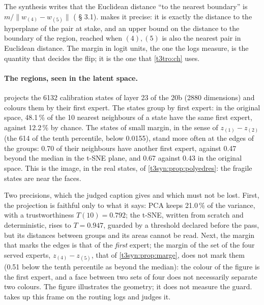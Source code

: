 \begin{remarque}
The synthesis writes that the Euclidean distance ``to the nearest boundary'' is $m/\|w_{(4)} - w_{(5)}\|$ ( § 3.1).  makes it precise: it is exactly the distance to the hyperplane of the pair at stake, and an upper bound on the distance to the boundary of the region, reached when $(4), (5)$ is also the nearest pair in Euclidean distance. The margin in logit units, the one the logs measure, is the quantity that decides the flip; it is the one that \cref{t3tro:ch} uses.
\end{remarque}

\begin{figure}[tbp]
\centering
\GrapheLatentsEtats
{}
\label{fig:t3-lat-etats}
\end{figure}

\paragraph{The regions, seen in the latent space.}  projects the \num{6132} calibration states of layer 23 of the 20b (\num{2880} dimensions) and colours them by their first expert. The states group by first expert: in the original space, 48.1\,\% of the 10 nearest neighbours of a state have the same first expert, against 12.2\,\% by chance. The states of small margin, in the sense of $z_{(1)} - z_{(2)}$ (the 614 of the tenth percentile, below 0.0155), stand more often at the edges of the groups: 0.70 of their neighbours have another first expert, against 0.47 beyond the median in the t-SNE plane, and 0.67 against 0.43 in the original space. This is the image, in the real states, of \cref{t3syn:prop:polyedres}: the fragile states are near the faces.

Two precisions, which the judged caption gives and which must not be lost. First, the projection is faithful only to what it says: PCA keeps 21.0\,\% of the variance, with a trustworthiness $T(10) = 0.792$; the t-SNE, written from scratch and deterministic, rises to $T = 0.947$, guarded by a threshold declared before the pass, but its distances between groups and its areas cannot be read. Next, the margin that marks the edges is that of the \emph{first} expert; the margin of the set of the four served experts, $z_{(4)} - z_{(5)}$, that of \cref{t3syn:prop:marge}, does not mark them (0.51 below the tenth percentile as beyond the median): the colour of the figure is the first expert, and a face between two sets of four does not necessarily separate two colours. The figure illustrates the geometry; it does not measure the guard.  takes up this frame on the routing logs and judges it.

